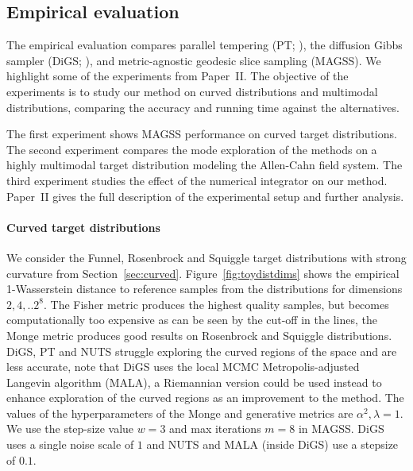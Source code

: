 \subsection*{Empirical evaluation}
The empirical evaluation compares parallel tempering (PT; \citealp{Latuszynski2025}), the diffusion Gibbs sampler (DiGS; \citealp{Chen2024}), and metric-agnostic geodesic slice sampling (MAGSS). We highlight some of the experiments from Paper~II. The objective of the experiments is to study our method on curved distributions and multimodal distributions, comparing the accuracy and running time against the alternatives. 

The first experiment shows MAGSS performance on curved target distributions. The second experiment compares the mode exploration of the methods on a highly multimodal target distribution modeling the Allen-Cahn field system. The third experiment studies the effect of the numerical integrator on our method. Paper~II gives the full description of the experimental setup and further analysis. 


\paragraph{Curved target distributions}
We consider the  Funnel, Rosenbrock and Squiggle target distributions with strong curvature from Section~\ref{sec:curved}. Figure~\ref{fig:toydistdims} shows the empirical 1-Wasserstein distance to reference samples from the distributions for dimensions $2,4,..2^8$. The Fisher metric produces the highest quality samples, but becomes computationally too expensive as can be seen by the cut-off in the lines, the Monge metric produces good results on Rosenbrock and Squiggle distributions. DiGS, PT and NUTS struggle exploring the curved regions of the space and are less accurate, note that DiGS uses the local MCMC  Metropolis-adjusted Langevin algorithm (MALA), a Riemannian version could be used instead to enhance exploration of the curved regions as an improvement to the method. The values of the hyperparameters of the Monge and generative metrics are $\alpha^2, \lambda=1$. 
We use the step-size value $w = 3$ and max iterations $m = 8$ in MAGSS.
DiGS uses a single noise scale of $1$ and NUTS and MALA (inside DiGS) use a stepsize of $0.1$. 

